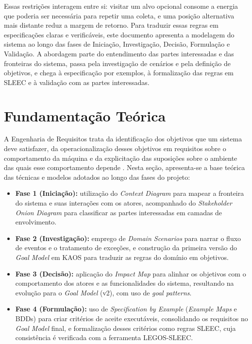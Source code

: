 \documentclass[a4paper, 12pt]{article}
\begin{document}
Essas restrições interagem entre si: visitar um alvo opcional consome a energia que poderia ser necessária para repetir uma coleta, e uma posição alternativa mais distante reduz a margem de retorno. Para traduzir essas regras em especificações claras e verificáveis, este documento apresenta a modelagem do sistema ao longo das fases de Iniciação, Investigação, Decisão, Formulação e Validação. A abordagem parte do entendimento das partes interessadas e das fronteiras do sistema, passa pela investigação de cenários e pela definição de objetivos, e chega à especificação por exemplos, à formalização das regras em SLEEC e à validação com as partes interessadas.

\section{Fundamentação Teórica}

A Engenharia de Requisitos trata da identificação dos objetivos que um sistema deve satisfazer, da operacionalização desses objetivos em requisitos sobre o comportamento da máquina e da explicitação das suposições sobre o ambiente das quais esse comportamento depende \cite{lamsweerde2009,letier2020}. Nesta seção, apresenta-se a base teórica das técnicas e modelos adotados ao longo das fases do projeto:

\begin{itemize}
  \item \textbf{Fase 1 (Iniciação):} utilização do \textit{Context Diagram} para mapear a fronteira do sistema e suas interações com os atores, acompanhado do \textit{Stakeholder Onion Diagram} para classificar as partes interessadas em camadas de envolvimento.
  \item \textbf{Fase 2 (Investigação):} emprego de \textit{Domain Scenarios} para narrar o fluxo de eventos e o tratamento de exceções, e construção da primeira versão do \textit{Goal Model} em KAOS para traduzir as regras do domínio em objetivos.
  \item \textbf{Fase 3 (Decisão):} aplicação do \textit{Impact Map} para alinhar os objetivos com o comportamento dos atores e as funcionalidades do sistema, resultando na evolução para o \textit{Goal Model} (v2), com uso de \textit{goal patterns}.
  \item \textbf{Fase 4 (Formulação):} uso de \textit{Specification by Example} (\textit{Example Maps} e BDDs) para criar critérios de aceite executáveis, consolidando os requisitos no \textit{Goal Model} final, e formalização desses critérios como regras SLEEC, cuja consistência é verificada com a ferramenta LEGOS-SLEEC.
\end{itemize}
\end{document}
